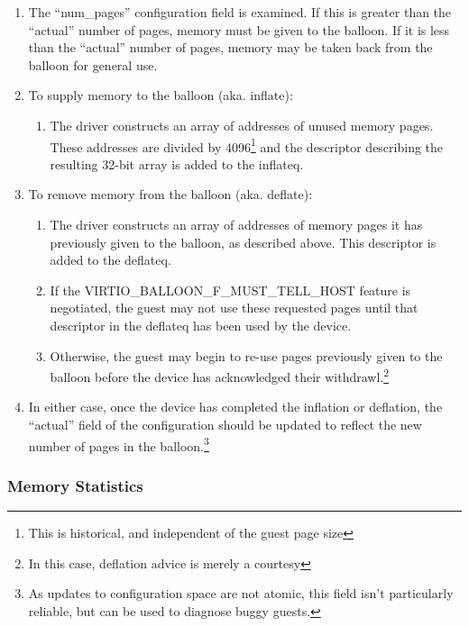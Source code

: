\begin{enumerate}
\item The “num_pages” configuration field is examined. If this is
  greater than the “actual” number of pages, memory must be given
  to the balloon. If it is less than the “actual” number of
  pages, memory may be taken back from the balloon for general
  use.

\item To supply memory to the balloon (aka. inflate):
  \begin{enumerate}
  \item The driver constructs an array of addresses of unused memory
    pages. These addresses are divided by 4096\footnote{This is historical, and independent of the guest page size
} and the descriptor
    describing the resulting 32-bit array is added to the inflateq.
  \end{enumerate}

\item To remove memory from the balloon (aka. deflate):
  \begin{enumerate}
  \item The driver constructs an array of addresses of memory pages
    it has previously given to the balloon, as described above.
    This descriptor is added to the deflateq.

  \item If the VIRTIO_BALLOON_F_MUST_TELL_HOST feature is negotiated, the
    guest may not use these requested pages until that descriptor
    in the deflateq has been used by the device.

  \item Otherwise, the guest may begin to re-use pages previously
    given to the balloon before the device has acknowledged their
    withdrawl.\footnote{In this case, deflation advice is merely a courtesy
}
  \end{enumerate}

\item In either case, once the device has completed the inflation or
  deflation, the “actual” field of the configuration should be
  updated to reflect the new number of pages in the balloon.\footnote{As updates to configuration space are not atomic, this field
isn't particularly reliable, but can be used to diagnose buggy guests.
}
\end{enumerate}

\subsubsection{Memory Statistics}\label{sec:Device Types / Memory Balloon Device / Device Operation / Memory Statistics}

